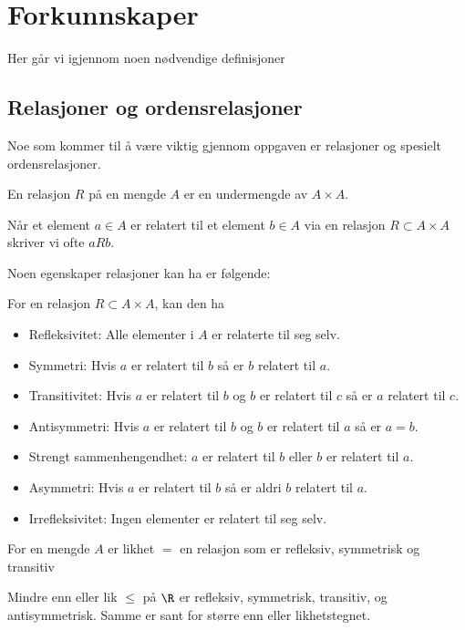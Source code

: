 \section{Forkunnskaper}
Her går vi igjennom noen nødvendige definisjoner

\subsection{Relasjoner og ordensrelasjoner}
Noe som kommer til å være viktig gjennom oppgaven er relasjoner og spesielt ordensrelasjoner.
\begin{definition}\label{Def:label}
    En relasjon $R$ på en mengde $A$ er en undermengde av $A\times A$.
\end{definition}
Når et element $a\in A$ er relatert til et element $b\in A$ via en relasjon $R\subset A\times A$ skriver vi ofte $aRb$.

Noen egenskaper relasjoner kan ha er følgende:

For en relasjon $R\subset A\times A$, kan den ha
\begin{itemize}
    \item Refleksivitet: Alle elementer i $A$ er relaterte til seg selv.
    \item Symmetri: Hvis $a$ er relatert til $b$ så er $b$ relatert til $a$.
    \item Transitivitet: Hvis $a$ er relatert til $b$ og $b$ er relatert til $c$ så er $a$ relatert til $c$.
    \item Antisymmetri: Hvis $a$ er relatert til $b$ og $b$ er relatert til $a$ så er $a=b$.
    \item Strengt sammenhengendhet: $a$ er relatert til $b$ eller $b$ er relatert til $a$.
    \item Asymmetri: Hvis $a$ er relatert til $b$ så er aldri $b$ relatert til $a$.
    \item Irrefleksivitet: Ingen elementer er relatert til seg selv.
\end{itemize}

\begin{example}\label{Ex:LikRel}
    For en mengde $A$ er likhet $=$ en relasjon som er refleksiv, symmetrisk og transitiv
\end{example}

\begin{example}\label{Ex:MinLikRel}
    Mindre enn eller lik $\leq$ på $\R$ er refleksiv, symmetrisk, transitiv, og antisymmetrisk. Samme er sant for større enn eller likhetstegnet.
\end{example}

